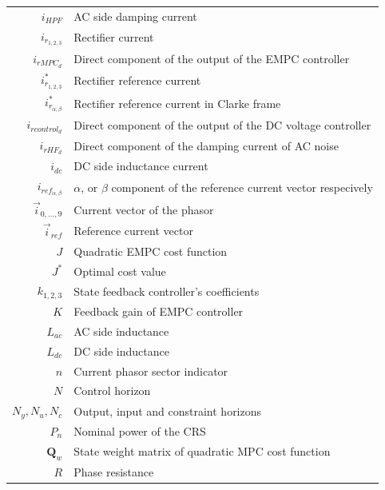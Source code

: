 \begin{scriptsize}
\begin{tabularx}{\textwidth}{r|X}
  $i_{HPF}$                         & AC side damping current\\
  $i_{r_{1,2,3}}$                   & Rectifier current\\
  $i_{rMPC_d}$                      & Direct component of the output of the EMPC controller\\
  $i^*_{r_{1,2,3}}$                 & Rectifier reference current\\
  $i^*_{r_{\alpha,\beta}}$          & Rectifier reference current in Clarke frame\\
  $i_{rcontrol_d}$                  & Direct component of the output of the DC voltage controller\\
  $i_{rHF_d}$                       & Direct component of the damping current of AC noise\\
  $i_{dc}$                          & DC side inductance current\\
  $i_{ref_{\alpha,\beta}}$          & $\alpha$, or $\beta$ component of the reference current vector respecively\\
  $\vec{i}_{0,\dots,9}$             & Current vector of the phasor\\
  $\vec{i}_{ref}$                   & Reference current vector\\
  $J$                               & Quadratic EMPC cost function\\
  $J^*$                             & Optimal cost value\\
  $k_{1,2,3}$                       & State feedback controller's coefficients\\
  $K$                               & Feedback gain of EMPC controller\\
  $L_{ac}$                          & AC side inductance\\
  $L_{dc}$                          & DC side inductance\\
  $n$                               & Current phasor sector indicator\\
  $N$                               & Control horizon\\
  $N_y,N_u,N_c$                     & Output, input and constraint horizons\\
  $P_n$                             & Nominal power of the CRS\\
  $\textbf{Q}_w$                & State weight matrix of quadratic MPC cost function\\
  $R$                               & Phase resistance\\

\end{tabularx}
\end{scriptsize}
